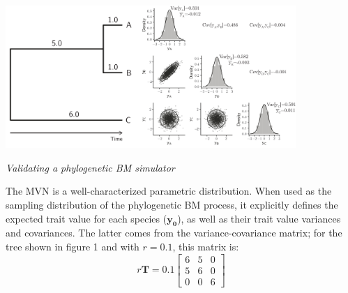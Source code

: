 \documentclass[oneside]{article}
\begin{document}
\begin{tcolorbox}[breakable, width=\textwidth, colback=gray!10, boxrule=0pt,
  title=Box 1: Models characterized by well-known parametric distributions, fonttitle=\bfseries]
\begin{center}
\includegraphics[width=11cm]{../figures/bmsim.png}
\label{fig:bmsim}
\end{center}

\emph{Validating a phylogenetic BM simulator}

The MVN is a well-characterized parametric distribution.
When used as the sampling distribution of the phylogenetic BM
process, it explicitly defines the expected trait value for
each species ($\boldsymbol{y_0}$), as well as their trait value
variances and covariances.
The latter comes from the variance-covariance matrix; for the
tree shown in figure 1 %
and with $r = 0.1$, this matrix
is:
\begin{equation}
  r\boldsymbol{T} = 0.1
  \begin{bmatrix}
    6 & 5 & 0\\
    5 & 6 & 0\\
    0 & 0 & 6
  \end{bmatrix}
  \label{eq:mat}
\end{equation}


\end{tcolorbox}
\end{document}
